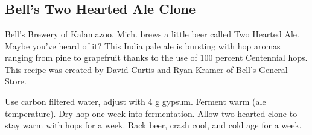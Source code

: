 \documentclass[10pt,oneside]{scrbook}
\begin{document}
\pagebreak

\begin{ingredientsblock}

\begin{malts}
\end{malts}

\begin{hops}
\end{hops}

\begin{yeasts}
\end{yeasts}

\end{ingredientsblock}

\part{\styleamericanipa}

\chapter*{Bell's Two Hearted Ale Clone}

\begin{aboutblock}
Bell's Brewery of Kalamazoo, Mich. brews a little beer called Two Hearted Ale. Maybe you've
heard of it? This India pale ale is bursting with hop aromas ranging from pine to grapefruit
thanks to the use of 100 percent Centennial hops. This recipe was created by David Curtis and
Ryan Kramer of Bell's General Store.
\end{aboutblock}


\begin{methodandtiming}
 
\begin{mashsteps}
\end{mashsteps}

\begin{directions}
Use carbon filtered water, adjust with 4 g gypsum. Ferment warm (ale temperature).
Dry hop one week into fermentation. Allow two hearted clone to stay warm with hops for a week.
Rack beer, crash cool, and cold age for a week.
\end{directions}

\end{methodandtiming}
\end{document}
